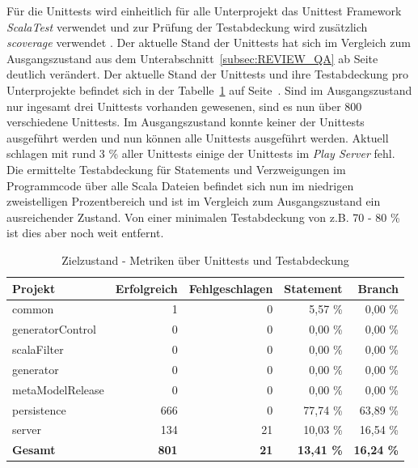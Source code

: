 Für die Unittests wird einheitlich für alle Unterprojekt das Unittest Framework \textit{ScalaTest} verwendet und zur Prüfung der Testabdeckung wird zusätzlich \textit{scoverage} verwendet \cite{scalatest_project,scoverage}. Der aktuelle Stand der Unittests hat sich im Vergleich zum Ausgangszustand aus dem Unterabschnitt~\ref{subsec:REVIEW_QA} ab Seite~\pageref{subsec:REVIEW_QA} deutlich verändert. Der aktuelle Stand der Unittests und ihre Testabdeckung pro Unterprojekte befindet sich in der Tabelle~\ref{tab:ZETA_METRICS_TESTS_NEW} auf Seite~\pageref{tab:ZETA_METRICS_TESTS_NEW}. Sind im Ausgangszustand nur ingesamt drei Unittests vorhanden gewesenen, sind es nun über 800 verschiedene Unittests. Im Ausgangszustand konnte keiner der Unittests ausgeführt werden und nun können alle Unittests ausgeführt werden. Aktuell schlagen mit rund 3 \% aller Unittests einige der Unittests im \textit{Play Server} fehl. Die ermittelte Testabdeckung für Statements und Verzweigungen im Programmcode über alle Scala Dateien befindet sich nun im niedrigen zweistelligen Prozentbereich und ist im Vergleich zum Ausgangszustand ein ausreichender Zustand. Von einer minimalen Testabdeckung von z.B. 70 - 80 \% ist dies aber noch weit entfernt.

\begin{table}[ht]
    \smallskip
    \centering
    \begin{tabular}{| l | r | r | r | r |}
    \hline
    \bf Projekt & \bf Erfolgreich & \bf Fehlgeschlagen & \bf Statement & \bf Branch \\ \hline
    common & 1 & 0 & 5,57 \% & 0,00 \% \\ \hline
    generatorControl & 0 & 0 & 0,00 \% & 0,00 \% \\ \hline
    scalaFilter & 0 & 0 & 0,00 \% & 0,00 \% \\ \hline
    generator & 0 & 0 & 0,00 \% & 0,00 \% \\ \hline
    metaModelRelease & 0 & 0 & 0,00 \% & 0,00 \% \\ \hline
    persistence & 666 & 0 & 77,74 \% & 63,89 \% \\ \hline
    server & 134 & 21 & 10,03 \% & 16,54 \% \\ \hline
    \bf Gesamt & \bf 801 & \bf 21 & \bf 13,41 \% & \bf 16,24 \% \\ \hline
    \end{tabular}
    \caption{Zielzustand - Metriken über Unittests und Testabdeckung \cite[Scoverage]{analys_new_coverage,analys_new}}
    \label{tab:ZETA_METRICS_TESTS_NEW}
\end{table}

